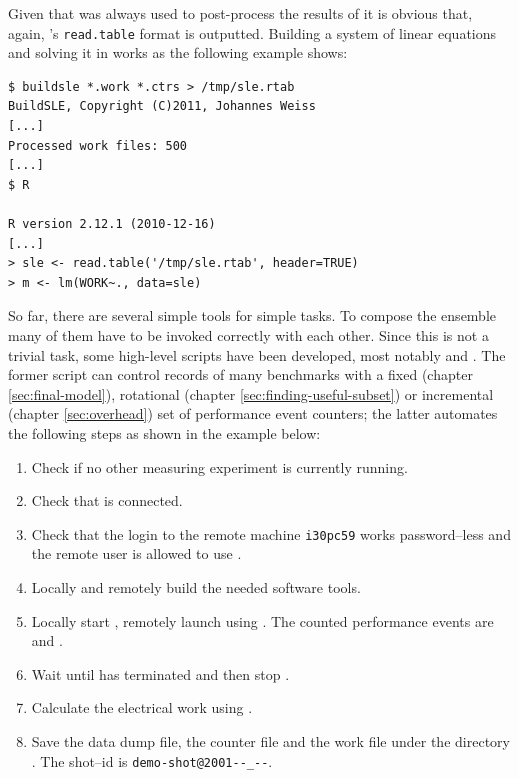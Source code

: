 Given that \JWTR{} was always used to post-process the results of \JWTbsle{}
it is obvious that, again, \JWTR's \texttt{read.table} \cite{r11data} format is
outputted. Building a system of linear equations and solving it in \JWTR{}
works as the following example shows:

\begin{lstlisting}[style=Shell]
$ buildsle *.work *.ctrs > /tmp/sle.rtab
BuildSLE, Copyright (C)2011, Johannes Weiss
[...]
Processed work files: 500
[...]
$ R

R version 2.12.1 (2010-12-16)
[...]
> sle <- read.table('/tmp/sle.rtab', header=TRUE)
> m <- lm(WORK~., data=sle)
\end{lstlisting}



So far, there are several simple tools for simple tasks. To compose the ensemble
many of them have to be invoked correctly with each other. Since this is not a
trivial task, some high-level scripts have been developed, most notably
 and \JWTdomeasuring{}.  The
former script can control records of many benchmarks with a fixed (chapter
\ref{sec:final-model}), rotational (chapter \ref{sec:finding-useful-subset}) or
incremental (chapter \ref{sec:overhead}) set of performance event counters; the
latter automates the following steps as shown in the example below:

\begin{enumerate}

\item Check if no other measuring experiment is currently running.

\item Check that \JWPni{} is connected.

\item Check that the login to the remote machine \texttt{i30pc59} works
password--less and the remote user is allowed to use .

\item Locally and remotely build the needed software tools.

\item Locally start \JWTdd{}, remotely launch  using \JWTdc{}.
The counted performance events are \JWctrCLK{} and \JWctrINST{}.

\item Wait until  has terminated and then stop \JWTdd{}.

\item Calculate the electrical work using \JWTfcw{}.

\item Save the data dump file, the counter file and the work file under the
directory . The shot--id is
\texttt{demo-\-shot\-@2001--\_--}.

\end{enumerate}

